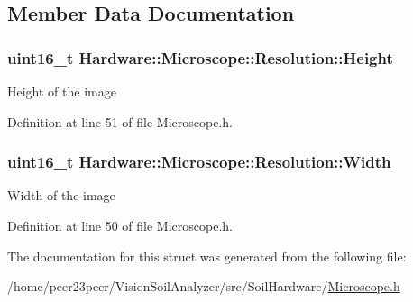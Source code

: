 \subsection{Member Data Documentation}
\hypertarget{struct_hardware_1_1_microscope_1_1_resolution_aaa54a929acd6e8c224182a97264c85d1}{}
\subsubsection[{Height}]{\setlength{\rightskip}{0pt plus 5cm}uint16\+\_\+t Hardware\+::\+Microscope\+::\+Resolution\+::\+Height}\label{struct_hardware_1_1_microscope_1_1_resolution_aaa54a929acd6e8c224182a97264c85d1}
Height of the image 

Definition at line 51 of file Microscope.\+h.

\hypertarget{struct_hardware_1_1_microscope_1_1_resolution_a0e1ef543db0224230559cd9c6531aad2}{}
\subsubsection[{Width}]{\setlength{\rightskip}{0pt plus 5cm}uint16\+\_\+t Hardware\+::\+Microscope\+::\+Resolution\+::\+Width}\label{struct_hardware_1_1_microscope_1_1_resolution_a0e1ef543db0224230559cd9c6531aad2}
Width of the image 

Definition at line 50 of file Microscope.\+h.



The documentation for this struct was generated from the following file\+:\begin{DoxyCompactItemize}
\item 
/home/peer23peer/\+Vision\+Soil\+Analyzer/src/\+Soil\+Hardware/\hyperlink{_microscope_8h}{Microscope.\+h}\end{DoxyCompactItemize}
